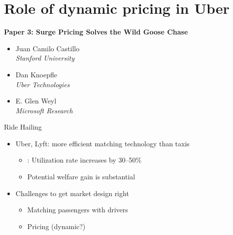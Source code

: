 
\section{Role of dynamic pricing in Uber}

	\begin{frame}
	\textbf{Paper 3: Surge Pricing Solves the Wild Goose Chase}
	\begin{itemize}
		\item Juan Camilo Castillo \\
		\textit{Stanford University}
		\item Dan Knoepfle \\
		\textit{Uber Technologies}
		\item E. Glen Weyl \\
		\textit{Microsoft Research}
	\end{itemize}
	\end{frame}

    \begin{frame}{Ride Hailing}
    \begin{itemize}
        \item Uber, Lyft: more efficient matching technology than taxis
        \begin{itemize}
            \item \textcite{cramer2016disruptive}: Utilization rate increases by 30--50\%
            \item Potential welfare gain is substantial \\
        \end{itemize}
        \pause
        \item Challenges to get market design right
        \begin{itemize}
            \item Matching passengers with drivers
            \item Pricing (dynamic?)
        \end{itemize}
    \end{itemize}
    \end{frame}

